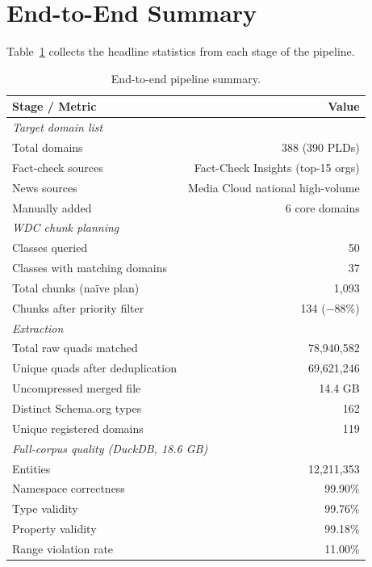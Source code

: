 \documentclass[11pt,a4paper]{article}
\begin{document}
\section{End-to-End Summary}
\label{sec:summary}

Table~\ref{tab:e2e} collects the headline statistics from each stage of
the pipeline.

\begin{table}[H]
\centering
\caption{End-to-end pipeline summary.}
\label{tab:e2e}
\begin{tabular}{lr}
\toprule
\textbf{Stage / Metric} & \textbf{Value} \\
\midrule
\multicolumn{2}{l}{\textit{Target domain list}} \\
Total domains & 388 (390 PLDs) \\
Fact-check sources & Fact-Check Insights (top-15 orgs) \\
News sources & Media Cloud national high-volume \\
Manually added & 6 core domains \\
\midrule
\multicolumn{2}{l}{\textit{WDC chunk planning}} \\
Classes queried & 50 \\
Classes with matching domains & 37 \\
Total chunks (na\"ive plan) & 1{,}093 \\
Chunks after priority filter & 134 ($-$88\%) \\
\midrule
\multicolumn{2}{l}{\textit{Extraction}} \\
Total raw quads matched & 78{,}940{,}582 \\
Unique quads after deduplication & 69{,}621{,}246 \\
Uncompressed merged file & 14.4 GB \\
Distinct Schema.org types & 162 \\
Unique registered domains & 119 \\
\midrule
\multicolumn{2}{l}{\textit{Full-corpus quality (DuckDB, 18.6 GB)}} \\
Entities & 12{,}211{,}353 \\
Namespace correctness & 99.90\% \\
Type validity & 99.76\% \\
Property validity & 99.18\% \\
Range violation rate & 11.00\% \\

\end{tabular}
\end{table}
\end{document}
